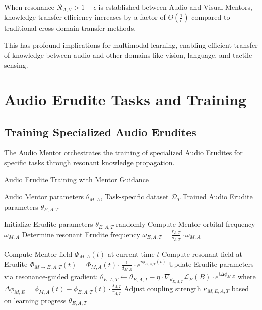 \begin{theorem}
When resonance $\mathcal{R}_{A,V} > 1-\epsilon$ is established between Audio and Visual Mentors, knowledge transfer efficiency increases by a factor of $\Theta(\frac{1}{\epsilon})$ compared to traditional cross-domain transfer methods.
\end{theorem}

This has profound implications for multimodal learning, enabling efficient transfer of knowledge between audio and other domains like vision, language, and tactile sensing.

\section{Audio Erudite Tasks and Training}

\subsection{Training Specialized Audio Erudites}

The Audio Mentor orchestrates the training of specialized Audio Erudites for specific tasks through resonant knowledge propagation.

\begin{algorithm}
\caption{Audio Erudite Training with Mentor Guidance}
\begin{algorithmic}[1]
\Require Audio Mentor parameters $\theta_{M,A}$, Task-specific dataset $\mathcal{D}_T$
\Ensure Trained Audio Erudite parameters $\theta_{E,A,T}$

\State Initialize Erudite parameters $\theta_{E,A,T}$ randomly
\State Compute Mentor orbital frequency $\omega_{M,A}$
\State Determine resonant Erudite frequency $\omega_{E,A,T} = \frac{r_{A,T}}{s_{A,T}} \cdot \omega_{M,A}$

        \State Compute Mentor field $\Phi_{M,A}(t)$ at current time $t$
        \State Compute resonant field at Erudite $\Phi_{M \rightarrow E,A,T}(t) = \Phi_{M,A}(t) \cdot \frac{1}{d_{M,E}} \cdot e^{i\phi_{E,A,T}(t)}$
        \State Update Erudite parameters via resonance-guided gradient:
        \State $\theta_{E,A,T} \leftarrow \theta_{E,A,T} - \eta \cdot \nabla_{\theta_{E,A,T}} \mathcal{L}_E(B) \cdot e^{i\Delta\phi_{M,E}}$
        \State where $\Delta\phi_{M,E} = \phi_{M,A}(t) - \phi_{E,A,T}(t) \cdot \frac{s_{A,T}}{r_{A,T}}$
    \EndFor
    \State Adjust coupling strength $\kappa_{M,E,A,T}$ based on learning progress
\EndFor
\State \Return $\theta_{E,A,T}$
\end{algorithmic}
\end{algorithm}

